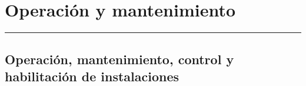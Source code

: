 \chapter{Operación y mantenimiento}

\vspace{\fill}

\hrule

\vspace{.3cm}

{\large \lipsum[1]} 

\pagestyle{fancy}

\newpage


	\section{Operación, mantenimiento, control y habilitación de instalaciones}
	\Biblio{}


\newpage
\pagestyle{empty}